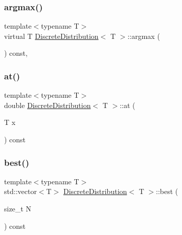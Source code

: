 \subsubsection{\texorpdfstring{argmax()}{argmax()}}
{\footnotesize\ttfamily template$<$typename T$>$ \\
virtual T \hyperlink{class_discrete_distribution}{Discrete\+Distribution}$<$ T $>$\+::argmax (\begin{DoxyParamCaption}{ }\end{DoxyParamCaption}) const\hspace{0.3cm}{\ttfamily [inline]}, {\ttfamily [virtual]}}

\mbox{\label{class_discrete_distribution_acb11f1cfbf4ef039c538f06cde8249fd}} 
\subsubsection{\texorpdfstring{at()}{at()}}
{\footnotesize\ttfamily template$<$typename T$>$ \\
double \hyperlink{class_discrete_distribution}{Discrete\+Distribution}$<$ T $>$\+::at (\begin{DoxyParamCaption}\item[{T}]{x }\end{DoxyParamCaption}) const\hspace{0.3cm}{\ttfamily [inline]}}

\mbox{\label{class_discrete_distribution_adee72a8e4c93aa03d841c0c73d6b5498}} 
\subsubsection{\texorpdfstring{best()}{best()}}
{\footnotesize\ttfamily template$<$typename T$>$ \\
std\+::vector$<$T$>$ \hyperlink{class_discrete_distribution}{Discrete\+Distribution}$<$ T $>$\+::best (\begin{DoxyParamCaption}\item[{size\+\_\+t}]{N }\end{DoxyParamCaption}) const\hspace{0.3cm}{\ttfamily [inline]}}

